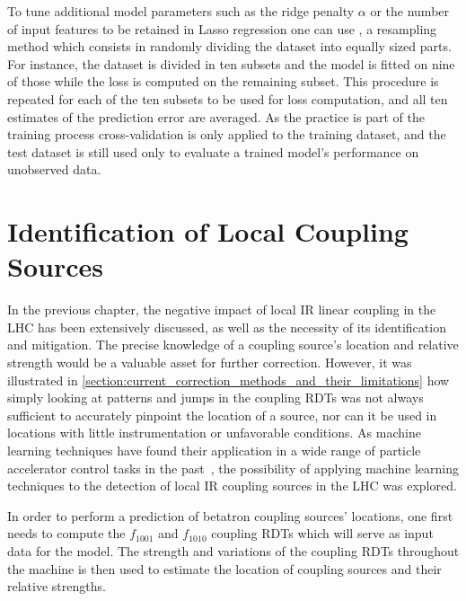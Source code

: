 To tune additional model parameters such as the ridge penalty \(\alpha\) or the number of input features to be retained in Lasso regression one can use , a resampling method which consists in randomly dividing the dataset into equally sized parts.
For instance, the dataset is divided in ten subsets and the model is fitted on nine of those while the loss is computed on the remaining subset.
This procedure is repeated for each of the ten subsets to be used for loss computation, and all ten estimates of the prediction error are averaged.
As the practice is part of the training process cross-validation is only applied to the training dataset, and the test dataset is still used only to evaluate a trained model's performance on unobserved data.

\section{Identification of Local Coupling Sources}

In the previous chapter, the negative impact of local IR linear coupling in the LHC has been extensively discussed, as well as the necessity of its identification and mitigation.
The precise knowledge of a coupling source's location and relative strength would be a valuable asset for further correction.
However, it was illustrated in \cref{section:current_correction_methods_and_their_limitations} how simply looking at patterns and jumps in the coupling RDTs was not always sufficient to accurately pinpoint the  location of a source, nor can it be used in locations with little instrumentation or unfavorable conditions.
As machine learning techniques have found their application in a wide range of particle accelerator control tasks in the past~\cite{IPAC:Fol:Machine_Learning_Methods_for_Optics_Measurements_and_Corrections_at_LHC, IEEE:Edelen:Neural_Networks_Modeling_Control_Particle_Accelerators, EPAC:Bozoki:Neural_Networks_Orbit_Control_Accelerators, IPAC:Meier:Orbit_Correction_Studies_using_Neural_Networks, EPAC:Kijima:Beam_Diagnostic_System_for_Accelerator_using_Neural_Networks, PRAB:Fol:Detection_Faulty_BPMs, EPJP:Fol:Supervised_Learning_Reconstruction_Magnet_Errors}, the possibility of applying machine learning techniques to the detection of local IR coupling sources in the LHC was explored.

In order to perform a prediction of betatron coupling sources' locations, one first needs to compute the \(f_{1001}\) and \(f_{1010}\) coupling RDTs which will serve as input data for the model.
The strength and variations of the coupling RDTs throughout the machine is then used to estimate the location of coupling sources and their relative strengths.

